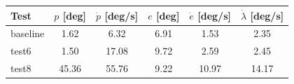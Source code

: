 \begin{tabular}{lccccc}
\hline
Test & $p$ [deg] & $\dot{p}$ [deg/s] & $e$ [deg] & $\dot{e}$ [deg/s] & $\dot{\lambda}$ [deg/s] \\
\hline
baseline & 1.62 & 6.32 & 6.91 & 1.53 & 2.35 \\
test6 & 1.50 & 17.08 & 9.72 & 2.59 & 2.45 \\
test8 & 45.36 & 55.76 & 9.22 & 10.97 & 14.17 \\
\hline
\end{tabular}
